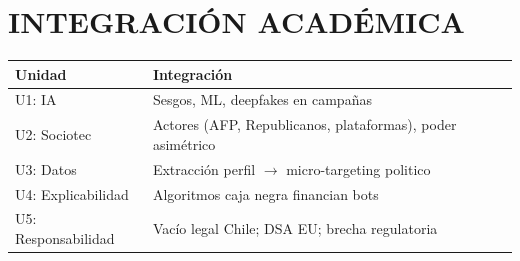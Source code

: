 \section*{\textcolor{ucblue}{\LARGE INTEGRACIÓN ACADÉMICA}}

{\fontsize{16}{20}\selectfont
\begin{tabular}{ll}
\toprule
\textbf{\textcolor{ucblue}{Unidad}} & \textbf{\textcolor{ucblue}{Integración}} \\
\midrule
U1: IA & Sesgos, ML, deepfakes en campañas \\
U2: Sociotec & Actores (AFP, Republicanos, plataformas), poder asimétrico \\
U3: Datos & Extracción perfil $\to$ micro-targeting politico \\
U4: Explicabilidad & Algoritmos caja negra financian bots \\
U5: Responsabilidad & Vacío legal Chile; DSA EU; brecha regulatoria \\
\bottomrule
\end{tabular}
}

\vspace{0.5cm}